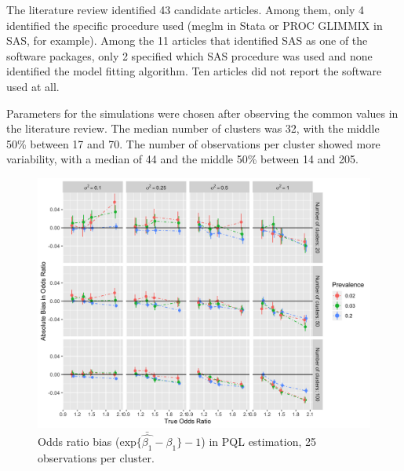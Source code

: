 \documentclass[Afour,times,sagev,doublespace]{sagej}
\begin{document}
The literature review identified 43 candidate articles. Among them, only 4 identified the specific procedure used (meglm in Stata or PROC GLIMMIX in SAS, for example). Among the 11 articles that identified SAS as one of the software packages, only 2 specified which SAS procedure was used and none identified the model fitting algorithm. Ten articles did not report the software used at all.

Parameters for the simulations were chosen after observing the common values in the literature review. The median number of clusters was 32, with the middle 50\% between 17 and 70. The number of observations per cluster showed more variability, with a median of 44 and the middle 50\% between 14 and 205.

\begin{figure}
\centering
\includegraphics[width=\linewidth]{_bias_pql_all_sbs.png}
  \caption{Odds ratio bias ($\text{exp} \{ \bar{\hat{\beta_1}} - \beta_1 \} - 1$) in PQL estimation, 25 observations per cluster.}
    \label{fig:_bias_pql_all_sbs_p25}
\end{figure}
\end{document}
